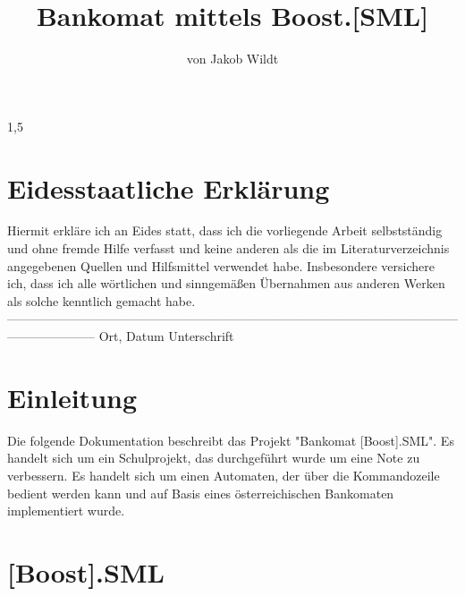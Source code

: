 \documentclass[a4paper]{article}
\title{Bankomat mittels Boost.[SML]}
\author{von Jakob Wildt}
\begin{document}
\maketitle
\large

\begin{center}
\end{center}
\newpage
\begin{spacing}{1,5}


\newpage
\section{Eidesstaatliche Erklärung}

Hiermit erkläre ich an Eides statt, dass ich die vorliegende Arbeit selbstständig und ohne fremde Hilfe verfasst und keine anderen als die im Literaturverzeichnis angegebenen Quellen und Hilfsmittel verwendet habe. Insbesondere versichere ich, dass ich alle wörtlichen und sinngemäßen Übernahmen aus anderen Werken als solche kenntlich gemacht habe.
\newline
\newline
\newline
\newline
\newline
\newline
---------------------------------------------------------------------------------------------------------------------------------
\newline
Ort, Datum
\hspace{300pt}
Unterschrift

\newpage

\tableofcontents

\newpage

\section{Einleitung}

Die folgende Dokumentation beschreibt das Projekt "Bankomat [Boost].SML". Es handelt sich um ein Schulprojekt, das durchgeführt wurde um eine Note zu verbessern. \newline
Es handelt sich um einen Automaten, der über die Kommandozeile bedient werden kann und auf Basis eines österreichischen Bankomaten implementiert wurde.  

\newpage

\section{[Boost].SML}


\end{spacing}
\end{document}
